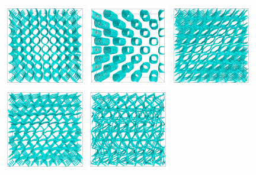 \documentclass[aps,pre,reprint,superscriptaddress, twocolumn]{revtex4}
\begin{document}
\begin{figure}[ht]
\includegraphics[width=0.32\textwidth]{disc-xy-400k_run1115.png}
\includegraphics[width=0.32\textwidth]{disc-yz-400k_run1115.png}
\includegraphics[width=0.32\textwidth]{disc-xy-700k_run1115.png}\\
\includegraphics[width=0.32\textwidth]{disc-xy-750k_run1115.png}
\includegraphics[width=0.32\textwidth]{disc-xy-1700k_run1115.png}

\end{figure}
\end{document}
